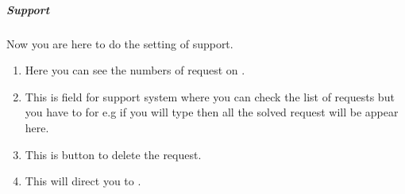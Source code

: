 \documentclass[a4paper,10pt,english]{report}
\begin{document}
\subparagraph{Support}
\label{\detokenize{support:support}}\label{\detokenize{support:id1}}\label{\detokenize{support::doc}}
\begin{figure}[htbp]
\centering

\noindent{}
\end{figure}

Now you are here to do the setting of support.
\begin{enumerate}
\def\theenumi{\arabic{enumi}}
\def\labelenumi{\theenumi .}
\makeatletter\def\p@enumii{\p@enumi \theenumi .}\makeatother
\item {} 
Here you can see the numbers of request on .

\item {} 
This is  field for support system where you can check the list of requests but you have to  for e.g if you will type  then all the solved request will be appear here.

\item {} 
This is  button to delete the request.

\item {} 
This will direct you to  .

\end{enumerate}

\begin{figure}[htbp]
\centering

\noindent{}
\end{figure}
\end{document}
